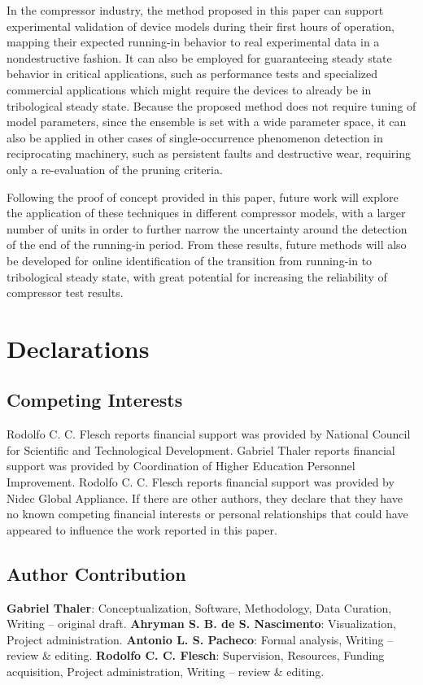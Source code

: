 \documentclass[preprint,11pt,number]{elsarticle}
\begin{document}
In the compressor industry, the method proposed in this paper can support experimental validation of device models during their first hours of operation, mapping their expected running-in behavior to real experimental data in a nondestructive fashion. It can also be employed for guaranteeing steady state behavior in critical applications, such as performance tests and specialized commercial applications which might require the devices to already be in tribological steady state. Because the proposed method does not require tuning of model parameters, since the ensemble is set with a wide parameter space, it can also be applied in other cases of single-occurrence phenomenon detection in reciprocating machinery, such as persistent faults and destructive wear, requiring only a re-evaluation of the pruning criteria. 

Following the proof of concept provided in this paper, future work will explore the application of these techniques in different compressor models, with a larger number of units in order to further narrow the uncertainty around the detection of the end of the running-in period. From these results, future methods will also be developed for online identification of the transition from running-in to tribological steady state, with great potential for increasing the reliability of compressor test results.

\section*{Declarations}

\subsection*{Competing Interests}
Rodolfo C. C. Flesch reports financial support was provided by National Council for Scientific and Technological Development. Gabriel Thaler reports financial support was provided by Coordination of Higher Education Personnel Improvement. Rodolfo C. C. Flesch reports financial support was provided by Nidec Global Appliance. If there are other authors, they declare that they have no known competing financial interests or personal relationships that could have appeared to influence the work reported in this paper.

\subsection*{Author Contribution}
\textbf{Gabriel Thaler}: Conceptualization, Software, Methodology, Data Curation, Writing – original draft. \textbf{Ahryman S. B. de S. Nascimento}: Visualization, Project administration. \textbf{Antonio L. S. Pacheco}: Formal analysis, Writing – review \& editing. \textbf{Rodolfo C. C. Flesch}: Supervision, Resources, Funding acquisition, Project administration, Writing – review \& editing.
\end{document}
